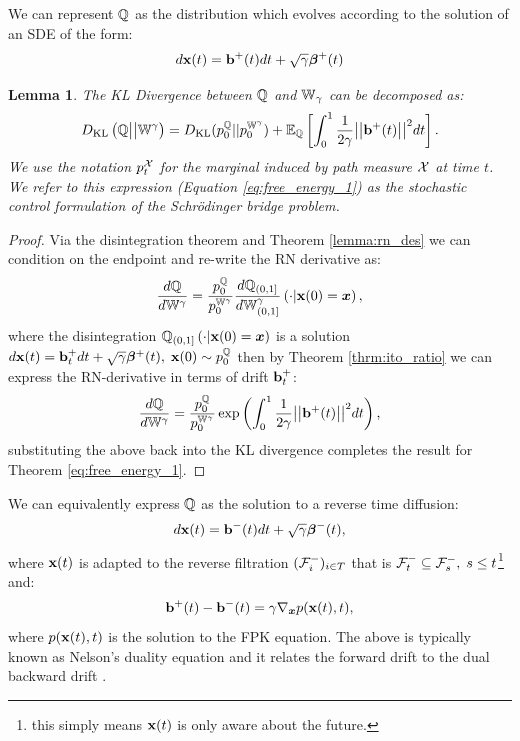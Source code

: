 \documentclass[a4paper,12pt,twoside,openright]{report}
\newtheorem{lemma}{Lemma}
\theoremstyle{definition}
\begin{document}
We can represent ${\mathbb{Q}}$ as the distribution which evolves according to the solution of an SDE of the form:
\begin{align*}
    d{\mathbf{x}}(t) = {\mathbf{b}}^{+}(t) dt + \sqrt{\gamma} {\bm{\beta}}^+(t)
\end{align*}
\begin{lemma}\citep{pavon1991free}
    The KL Divergence between ${\mathbb{Q}}$ and $\mathbb{W}_{\gamma}$ can be decomposed as:
\begin{align}\label{eq:free_energy_1}
     D_{\mathrm{KL}}\left({\mathbb{Q}} \big|\big| \mathbb{W}^{\gamma}\right) = D_{\mathrm{KL}}(p^{{\mathbb{Q}}}_0 || p_0^{ \mathbb{W}^{\gamma}}) + \mathbb{E}_{\mathbb{Q}}\left[\int_0^1 \frac{1}{2\gamma}\big|\big|{\mathbf{b}}^{+}(t) \big|\big|^2 dt\right].
\end{align}
We use the notation $p^{{\mathcal{X}}}_t$ for the marginal induced by path measure ${\mathcal{X}}$ at time $t$. We refer to this expression (Equation \ref{eq:free_energy_1}) as the stochastic control formulation of the Schrödinger bridge problem.
\end{lemma}
\begin{proof}
Via the disintegration theorem and Theorem \ref{lemma:rn_des} we can condition on the endpoint and re-write the RN derivative as:
\begin{align*}
    \frac{d{\mathbb{Q}}}{d\mathbb{W}^{ \gamma}} = \frac{p_0^{\mathbb{Q}}}{p_0^{ \mathbb{W}^{\gamma}}} \frac{d{\mathbb{Q}}_{(0,1]}}{d\mathbb{W}_{(0,1]}^{\gamma}}\left(\cdot | {\mathbf{x}}(0) ={\bm{x}}\right),
\end{align*}
where the disintegration ${\mathbb{Q}}_{(0,1]}\left(\cdot | {\mathbf{x}}(0) = {\bm{x}} \right)$ is a solution $d{\mathbf{x}}(t) = {\mathbf{b}}_t^+ dt + \sqrt{\gamma} {\bm{\beta}}^+(t), \; {\mathbf{x}}(0) \sim p_0^{\mathbb{Q}}$ then by Theorem \ref{thrm:ito_ratio} we can express the RN-derivative in terms of  drift ${\mathbf{b}}_t^+$:
\begin{align*}
    \frac{d{\mathbb{Q}}}{d\mathbb{W}^{\gamma}} = \frac{p_0^{\mathbb{Q}}}{p_0^{ \mathbb{W}^{\gamma}}}\exp\left(\int_0^1\frac{1}{2\gamma} \big|\big|{\mathbf{b}}^+(t)\big|\big|^2 dt\right),
\end{align*}
 substituting the above back into the KL divergence completes the result for Theorem \ref{eq:free_energy_1}.
\end{proof}
 We can equivalently express ${\mathbb{Q}}$ as the solution to a reverse time diffusion:
\begin{align}
    d{\mathbf{x}}(t) = {\mathbf{b}}^{-}(t) dt + \sqrt{\gamma} {\bm{\beta}}^{-}(t), 
\end{align}
where ${\mathbf{x}}(t)$ is adapted to the reverse filtration $({\mathcal{F}}^{-}_i)_{i\in T}$ that is ${\mathcal{F}}^{-}_t \subseteq {\mathcal{F}}^{-}_s, \; s \leq t$\footnote{this simply means ${\mathbf{x}}(t)$  is only aware about the future.} and:
\begin{align}\label{eq:nelson}
    {{\mathbf{b}}^{+}(t) - {\mathbf{b}}^{-}(t)} =\gamma \nabla_{{\bm{x}}} p({\mathbf{x}}(t), t),
\end{align}
where $p({\mathbf{x}}(t), t)$ is the solution to the FPK equation. The above is typically known as Nelson's duality equation and it relates the forward drift to the dual backward drift \citep{nelson1967dynamical}. 
\end{document}
